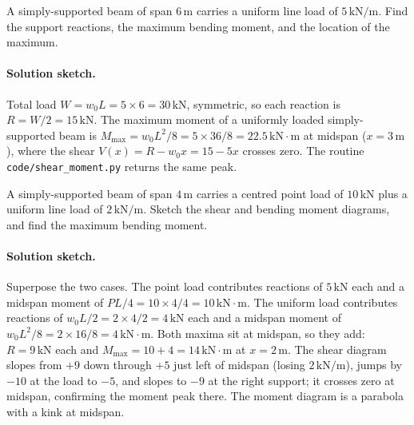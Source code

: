 \begin{exercise}
A simply-supported beam of span $6\,\si{\meter}$ carries a uniform
line load of $5\,\text{kN}/\text{m}$. Find the support reactions, the
maximum bending moment, and the location of the maximum.

\paragraph{Solution sketch.} Total load $W = w_0 L = 5 \times 6 =
30\,\text{kN}$, symmetric, so each reaction is $R = W/2 =
15\,\text{kN}$. The maximum moment of a uniformly loaded
simply-supported beam is $M_{\max} = w_0 L^2 / 8 = 5 \times 36 / 8 =
22.5\,\text{kN}\cdot\text{m}$ at midspan ($x = 3\,\si{\meter}$), where
the shear $V(x) = R - w_0 x = 15 - 5x$ crosses zero. The routine
\texttt{code/shear\_moment.py} returns the same peak.
\end{exercise}

\begin{exercise}
A simply-supported beam of span $4\,\si{\meter}$ carries a centred
point load of $10\,\text{kN}$ plus a uniform line load of $2\,
\text{kN}/\text{m}$. Sketch the shear and bending moment diagrams,
and find the maximum bending moment.

\paragraph{Solution sketch.} Superpose the two cases. The point load
contributes reactions of $5\,\text{kN}$ each and a midspan moment of
$PL/4 = 10 \times 4 / 4 = 10\,\text{kN}\cdot\text{m}$. The uniform load
contributes reactions of $w_0 L / 2 = 2 \times 4 / 2 = 4\,\text{kN}$
each and a midspan moment of $w_0 L^2 / 8 = 2 \times 16 / 8 =
4\,\text{kN}\cdot\text{m}$. Both maxima sit at midspan, so they add:
$R = 9\,\text{kN}$ each and $M_{\max} = 10 + 4 =
14\,\text{kN}\cdot\text{m}$ at $x = 2\,\si{\meter}$. The shear diagram
slopes from $+9$ down through $+5$ just left of midspan (losing
$2\,\text{kN}/\text{m}$), jumps by $-10$ at the load to $-5$, and slopes
to $-9$ at the right support; it crosses zero at midspan, confirming the
moment peak there. The moment diagram is a parabola with a kink at
midspan.
\end{exercise}

